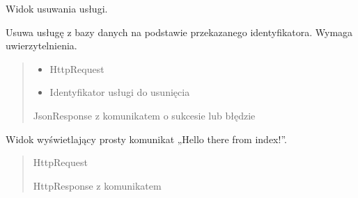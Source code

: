\documentclass[letterpaper,10pt,polish]{sphinxmanual}
\begin{document}

\begin{fulllineitems}
\label{\detokenize{mainApp:mainApp.views.delete_service}}
\pysigstartsignatures
{}
\pysigstopsignatures
\sphinxAtStartPar
Widok usuwania usługi.

\sphinxAtStartPar
Usuwa usługę z bazy danych na podstawie przekazanego identyfikatora.
Wymaga uwierzytelnienia.
\begin{quote}\begin{description}
\begin{itemize}
\item {} 
\sphinxAtStartPar
{} \textendash{} HttpRequest

\item {} 
\sphinxAtStartPar
{} \textendash{} Identyfikator usługi do usunięcia

\end{itemize}

\sphinxAtStartPar
JsonResponse z komunikatem o sukcesie lub błędzie

\end{description}\end{quote}

\end{fulllineitems}


\begin{fulllineitems}
\label{\detokenize{mainApp:mainApp.views.index}}
\pysigstartsignatures
{}
\pysigstopsignatures
\sphinxAtStartPar
Widok wyświetlający prosty komunikat „Hello there from index!”.
\begin{quote}\begin{description}
\sphinxAtStartPar
{} \textendash{} HttpRequest

\sphinxAtStartPar
HttpResponse z komunikatem

\end{description}\end{quote}

\end{fulllineitems}
\end{document}
